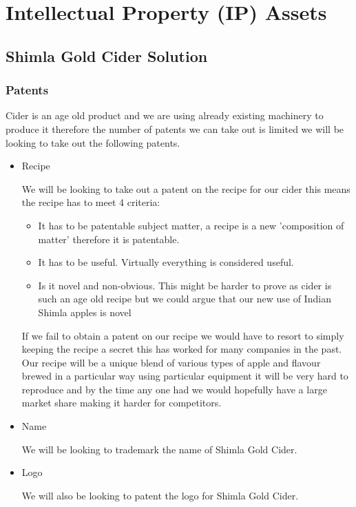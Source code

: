 \documentclass[11pt]{article}
\begin{document}
\newpage


\section{Intellectual Property (IP) Assets}
  \subsection{Shimla Gold Cider Solution}
    \subsubsection{Patents}
Cider is an age old product and we are using already existing machinery to
produce it therefore the number of patents we can take out is limited we will be
looking to take out the following patents.

\begin{itemize}

\item Recipe

We will be looking to take out a patent on the recipe for our cider this means 
the recipe has to meet 4 criteria:
 	      \begin{itemize}
		    \item It has to be patentable subject matter, a recipe is a new 
'composition of matter' therefore it is patentable.
		    \item It has to be useful. Virtually everything is considered useful.
		    \item Is it novel and non-obvious. This might be harder to prove as 
cider is such an age old recipe but we could argue that our new use of Indian 
Shimla apples is novel
	      \end{itemize}
If we fail to obtain a patent on our recipe we would have to resort to simply
keeping the recipe a secret this has worked for many companies in the past. Our
recipe will be a unique blend of various types of apple and flavour brewed in a
particular way using particular equipment it will be very hard to reproduce and
by the time any one had we would hopefully have a large market share making it
harder for competitors.

\item Name

We will be looking to trademark the name of Shimla Gold Cider.

\item Logo

We will also be looking to patent the logo for Shimla Gold Cider.
\end{itemize}
\end{document}
